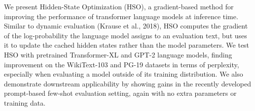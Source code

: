 We present Hidden-State Optimization (HSO), a gradient-based method for improving the performance of transformer language models at inference time. Similar to dynamic evaluation (Krause et al., 2018), HSO computes the gradient of the log-probability the language model assigns to an evaluation text, but uses it to update the cached hidden states rather than the model parameters. We test HSO with pretrained Transformer-XL and GPT-2 language models, finding improvement on the WikiText-103 and PG-19 datasets in terms of perplexity, especially when evaluating a model outside of its training distribution. We also demonstrate downstream applicability by showing gains in the recently developed prompt-based few-shot evaluation setting, again with no extra parameters or training data.
